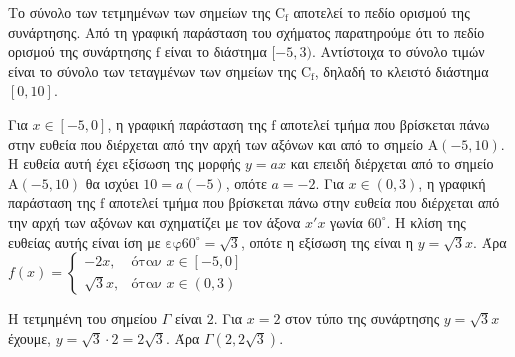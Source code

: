 \begin{alist}
    \item Το σύνολο των τετμημένων των σημείων της $\mathrm{C_f}$ αποτελεί το πεδίο ορισμού της συνάρτησης. Από τη γραφική παράσταση του σχήματος παρατηρούμε ότι το πεδίο ορισμού της συνάρτησης $\mathrm{f}$ είναι το διάστημα $[-5,3)$. Αντίστοιχα το σύνολο τιμών είναι το σύνολο των τεταγμένων των σημείων της $\mathrm{C_f}$, δηλαδή το κλειστό διάστημα $[0,10]$. 
    \item Για $x \in [-5,0]$, η γραφική παράσταση της $\mathrm{f}$ αποτελεί τμήμα που βρίσκεται πάνω στην ευθεία που διέρχεται από την αρχή των αξόνων και από το σημείο $\mathrm{A}(-5,10)$. Η ευθεία αυτή έχει εξίσωση της μορφής $y=ax$ και επειδή διέρχεται από το σημείο $\mathrm{A}(-5,10)$ θα ισχύει $10 = a(-5)$, οπότε $a=-2$.
    Για $x \in (0,3)$, η γραφική παράσταση της $\mathrm{f}$ αποτελεί τμήμα που βρίσκεται πάνω στην ευθεία που διέρχεται από την αρχή των αξόνων και σχηματίζει με τον άξονα $x'x$ γωνία $60^\circ$. Η κλίση της ευθείας αυτής είναι ίση με $\text{εφ}60^\circ = \sqrt{3}$, οπότε η εξίσωση της είναι η $y=\sqrt{3}x$.
    Άρα $f(x) = \begin{cases} -2x, & \text{όταν } x \in [-5,0] \\ \sqrt{3}x, & \text{όταν } x \in (0,3) \end{cases}$ 
    \item Η τετμημένη του σημείου $\Gamma$ είναι $2$. Για $x=2$ στον τύπο της συνάρτησης $y=\sqrt{3}x$ έχουμε, $y = \sqrt{3} \cdot 2 = 2\sqrt{3}$. Άρα $\Gamma(2, 2\sqrt{3})$. 
\end{alist}